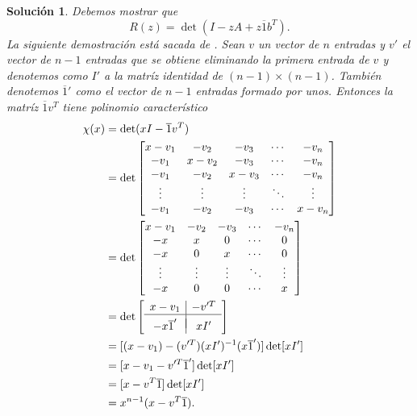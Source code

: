 \documentclass[11pt]{article}
\newtheorem*{sol}{Solución}
\newcommand\ol\overline
\begin{document}
\begin{sol}
  Debemos mostrar que
   \begin{equation}
    R(z) = \det(I-zA+z\ol 1 b^T)
  .\end{equation}
  La siguiente demostración está sacada de
  \cite[p.213]{butcher2004numerical}.
  Sean $v$ un vector de $n$ entradas y $v'$ el vector de $n-1$
  entradas que se obtiene eliminando la primera entrada de $v$ y
  denotemos como $I'$ a la matríz identidad de $(n-1)\times(n-1)$.
  También denotemos $\ol 1'$ como el vector de $n-1$ entradas formado
  por unos. Entonces la matríz $\ol 1v^{T}$ tiene polinomio
  característico
  \begin{align}
    \chi(x)
    &= 
    \det(xI - \ol 1 v^T) \\
    &= \det
    \begin{bmatrix}
      x-v_1 & -v_2 & -v_3 & \cdots & -v_n \\
      -v_1 & x-v_2 & -v_3 & \cdots & -v_n \\
      -v_1 & -v_2 & x-v_3 & \cdots & -v_n \\
      \vdots & \vdots & \vdots & \ddots & \vdots \\
      -v_1 & -v_2 & -v_3 & \cdots & x-v_n \\
    \end{bmatrix}
    \\
    &= \det
    \begin{bmatrix}
      x-v_1 & -v_2 & -v_3 & \cdots & -v_n \\
      -x & x & 0 & \cdots & 0 \\
      -x & 0 & x & \cdots & 0 \\
      \vdots & \vdots & \vdots & \ddots & \vdots \\
      -x & 0 & 0 & \cdots & x \\
    \end{bmatrix}
    \\
    &= \det
    \left[
      \begin{array}{c|c}
        x-v_1 & -v'^T \\
        \hline \\[-3mm]
        -x\ol 1' & xI'
      \end{array}
  \right]
    \\
    &= [(x-v_1)-(v'^T)(xI')^{-1}(x\ol 1')]\det[xI'] \\
    &= [x-v_1-v'^T\ol 1']\det[xI'] \\
    &= [x-v^{T}\ol 1]\det[xI'] \\
    &= x^{n-1}(x-v^{T}\ol 1)
  .\end{align}

\end{sol}
\end{document}
